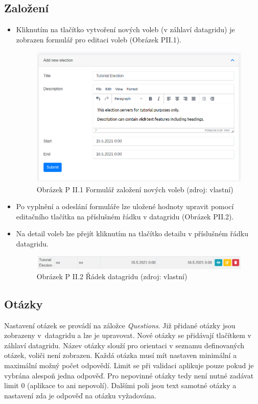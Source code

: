 \subsection*{Založení}
\begin{itemize}
	\item Kliknutím na tlačítko vytvoření nových voleb (v záhlaví datagridu) je zobrazen formulář pro editaci voleb (Obrázek PII.1).
	\begin{figure}[h]
	\centering
	\includegraphics[width=\linewidth]{tex/attachements/noveVolbyForm.png}
	\captionsetup{width=\linewidth}
	\caption*{Obrázek P II.1 Formulář založení nových voleb (zdroj: vlastní)}
\end{figure}
	\item Po vyplnění a odeslání formuláře lze uložené hodnoty upravit pomocí editačního tlačítka na příslušném řádku v datagridu (Obrázek PII.2).
	\item Na detail voleb lze přejít kliknutím na tlačítko detailu v příslušném řádku datagridu.
	\begin{figure}[h]
	\centering
	\includegraphics[width=\linewidth]{tex/attachements/noveVolbyGrid.png}
	\captionsetup{width=\linewidth}
	\caption*{Obrázek P II.2 Řádek datagridu (zdroj: vlastní)}
\end{figure}
\end{itemize}






\subsection*{Otázky}
Nastavení otázek se provádí na záložce \textit{Questions}. Již přidané otázky jsou zobrazeny v~datagridu a lze je upravovat. Nové otázky se přidávají tlačítkem v záhlaví datagridu. Název otázky slouží pro orientaci v seznamu definovaných otázek, voliči není zobrazen. Každá otázka musí mít nastaven minimální a maximální možný počet odpovědí. Limit se při validaci aplikuje pouze pokud je vybrána alespoň jedna odpověď. Pro nepovinné otázky tedy není nutné zadávat limit 0 (aplikace to ani nepovolí). Dalšími poli jsou text samotné otázky a nastavení zda je odpověď na otázku vyžadována. 

